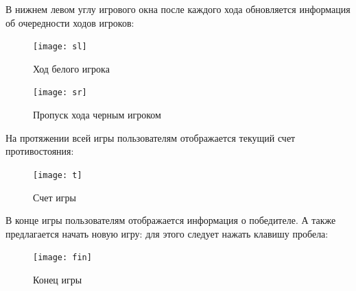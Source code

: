 \documentclass[oneside,final,14pt]{extreport}
\begin{document}
В нижнем левом углу игрового окна после каждого хода обновляется информация об очередности ходов игроков:
\vspace{7mm}
\begin{figure}[h]
    \centering
    \texttt{[image: sl]}
    \caption{Ход белого игрока}
    \label{fig:my_label}
\end{figure}
\vspace{7mm}
\begin{figure}[h]
    \centering
    \texttt{[image: sr]}
    \caption{Пропуск хода черным игроком}
    \label{fig:my_label}
\end{figure}

\vspace{7mm}
На протяжении всей игры пользователям отображается текущий счет противостояния:
\vspace{7mm}
\begin{figure}[h]
    \centering
    \texttt{[image: t]}
    \caption{Счет игры}
    \label{fig:my_label}
\end{figure}

\newpage
В конце игры пользователям отображается информация о победителе. А также предлагается начать новую игру: для этого следует нажать клавишу пробела:
\vspace{7mm}
\begin{figure}[h]
    \centering
    \texttt{[image: fin]}
    \caption{Конец игры}
    \label{fig:my_label}
\end{figure}
\end{document}
